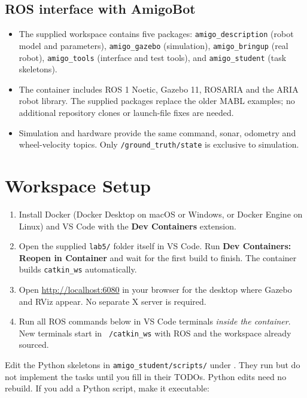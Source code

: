 \documentclass[12pt]{article}
\begin{document}
\subsection*{ROS interface with AmigoBot}

\begin{itemize}
  \item The supplied workspace contains five packages: \texttt{amigo\_description} (robot model and parameters), \texttt{amigo\_gazebo} (simulation), \texttt{amigo\_bringup} (real robot), \texttt{amigo\_tools} (interface and test tools), and \texttt{amigo\_student} (task skeletons).
  \item The container includes ROS 1 Noetic, Gazebo 11, ROSARIA and the ARIA robot library. The supplied packages replace the older MABL examples; no additional repository clones or launch-file fixes are needed.
  \item Simulation and hardware provide the same command, sonar, odometry and wheel-velocity topics. Only \texttt{/ground\_truth/state} is exclusive to simulation.
\end{itemize}

\section*{Workspace Setup}

\begin{enumerate}
  \item Install Docker (Docker Desktop on macOS or Windows, or Docker Engine on Linux) and VS Code with the \textbf{Dev Containers} extension.
  \item Open the supplied \texttt{lab5/} folder itself in VS Code. Run \textbf{Dev Containers: Reopen in Container} and wait for the first build to finish. The container builds \texttt{catkin\_ws} automatically.
  \item Open \url{http://localhost:6080} in your browser for the desktop where Gazebo and RViz appear. No separate X server is required.
  \item Run all ROS commands below in VS Code terminals \emph{inside the container}. New terminals start in \texttt{\string~/catkin\_ws} with ROS and the workspace already sourced.
\end{enumerate}

Edit the Python skeletons in \texttt{amigo\_student/scripts/} under
.
They run but do not implement the tasks until you fill in their TODOs.
Python edits need no rebuild. If you add a Python script, make it executable:
\end{document}
